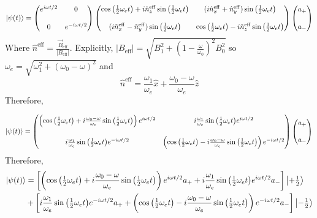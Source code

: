 \documentclass[12pt]{extarticle}
\begin{document}
\[ \left| \psi(t) \right> =
\begin{pmatrix}
e^{i \omega t /2} & 0 \\ \\
0  & e^{-i \omega t /2}
\end{pmatrix}
\begin{pmatrix}
\cos{\left(\tfrac{1}{2} \omega_{e} t \right)} + i \hat{n}^{\mathrm{eff}}_z \sin{\left(\tfrac{1}{2} \omega_{e} t \right)} & (i \hat{n}^{\mathrm{eff}}_x + \hat{n}^{\mathrm{eff}}_y) \sin{\left(\tfrac{1}{2} \omega_{e} t \right)} \\ \\
(i \hat{n}^{\mathrm{eff}}_x - \hat{n}^{\mathrm{eff}}_y) \sin{\left(\tfrac{1}{2} \omega_{e} t \right)}  & \cos{\left(\tfrac{1}{2} \omega_{e} t \right)} - i \hat{n}^{\mathrm{eff}}_z \sin{\left(\tfrac{1}{2} \omega_{e} t \right)}
\end{pmatrix}
\begin{pmatrix}
a_{+}  \\\\
a_{-}
\end{pmatrix}
\]
Where $\hat{n}^{\mathrm{eff}} = \frac{\vec{B}_{\mathrm{eff}}}{|B_{\mathrm{eff}}|}$. Explicitly, $|B_{\mathrm{eff}}| = \sqrt{B_1^2 + \left(1 - \frac{\omega}{\omega_0}\right)^2 B_0^2}$ so $\omega_{e} = \sqrt{\omega_1^2 + (\omega_0 - \omega)^2}$ and \[\hat{n}^{\mathrm{eff}} = \frac{\omega_1}{\omega_{e}} \hat{x} + \frac{\omega_0 - \omega}{\omega_{e}} \hat{z}\] 
Therefore, 

\[ \left| \psi(t) \right> =
\begin{pmatrix}
\left( \cos{\left(\tfrac{1}{2} \omega_{e} t \right)} + i \frac{\omega_0 - \omega}{\omega_{e}} \sin{\left(\tfrac{1}{2} \omega_{e} t \right)} \right) e^{i \omega t /2} & i \frac{\omega_1}{\omega_{e}} \sin{\left(\tfrac{1}{2} \omega_{e} t \right)} e^{i \omega t /2} \\ \\
i \frac{\omega_1}{\omega_{e}} \sin{\left(\tfrac{1}{2} \omega_{e} t \right)} e^{-i \omega t /2}  & \left( \cos{\left(\tfrac{1}{2} \omega_{e} t \right)} - i \frac{\omega_0 - \omega}{\omega_{e}} \sin{\left(\tfrac{1}{2} \omega_{e} t \right)} \right) e^{-i \omega t /2}
\end{pmatrix}
\begin{pmatrix}
a_{+}  \\\\
a_{-}
\end{pmatrix}
\]
Therefore,
\begin{align*}
\left| \psi(t) \right> & = \left[ \left( \cos{\left(\tfrac{1}{2} \omega_{e} t \right)} + i \frac{\omega_0 - \omega}{\omega_{e}} \sin{\left(\tfrac{1}{2} \omega_{e} t \right)} \right) e^{i \omega t /2} a_{+} + i \frac{\omega_1}{\omega_{e}} \sin{\left(\tfrac{1}{2} \omega_{e} t \right)} e^{i \omega t /2} a_{-} \right] \left| + \tfrac{1}{2} \right> \\  
& + 
\left[ i \frac{\omega_1}{\omega_{e}} \sin{\left(\tfrac{1}{2} \omega_{e} t \right)} e^{-i \omega t /2} a_{+} + \left( \cos{\left(\tfrac{1}{2} \omega_{e} t \right)} - i \frac{\omega_0 - \omega}{\omega_{e}} \sin{\left(\tfrac{1}{2} \omega_{e} t \right)} \right) e^{-i \omega t /2} a_{-} \right] \left| - \tfrac{1}{2} \right>
\end{align*} 
\end{document}
